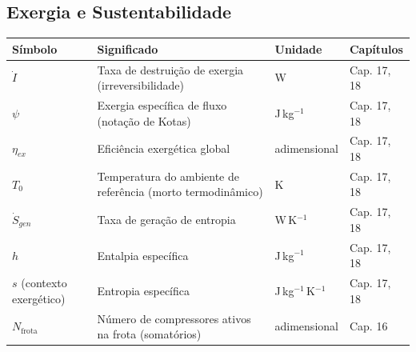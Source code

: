 \documentclass[12pt,a4paper]{article}
\numberwithin{equation}{section}
\numberwithin{table}{section}
\numberwithin{figure}{section}
\begin{document}
{{\subsection*{Exergia e Sustentabilidade}
\begin{longtable}{>{\raggedright\arraybackslash}p{2.8cm} >{\raggedright\arraybackslash}p{5.3cm} >{\raggedright\arraybackslash}p{2.1cm} >{\raggedright\arraybackslash}p{4.2cm}}
	\toprule
	\textbf{Símbolo} & \textbf{Significado} & \textbf{Unidade} & \textbf{Capítulos} \\ \midrule
	\endhead
	$\dot{I}$ & Taxa de destruição de exergia (irreversibilidade) & W & Cap. 17, 18 \\
	$\psi$\dag & Exergia específica de fluxo (notação de Kotas) & J\,kg$^{-1}$ & Cap. 17, 18 \\
	$\eta_{ex}$ & Eficiência exergética global & adimensional & Cap. 17, 18 \\
	$T_0$ & Temperatura do ambiente de referência (morto termodinâmico) & K & Cap. 17, 18 \\
	$\dot{S}_{gen}$ & Taxa de geração de entropia & W\,K$^{-1}$ & Cap. 17, 18 \\
	$h$ & Entalpia específica & J\,kg$^{-1}$ & Cap. 17, 18 \\
	$s$ (contexto exergético) & Entropia específica & J\,kg$^{-1}$\,K$^{-1}$ & Cap. 17, 18 \\
	$N_{\text{frota}}$\dag & Número de compressores ativos na frota (somatórios) & adimensional & Cap. 16 \\ \bottomrule
\end{longtable}

}}
\end{document}
